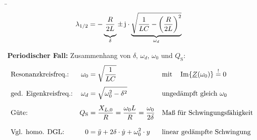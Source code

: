 \begin{frame}[t]
{}%
\b{%
\begin{minipage}{\textwidth}\centering
    \begin{minipage}[t][3cm][]{0.48\textwidth}\centering
    \end{minipage}%
    \begin{minipage}[t][3cm][]{0.48\textwidth}\centering
    \begin{align*}
        \lambda_{1/2} &= -\underbrace{
            \vphantom{\sqrt{\left(\frac{R}{2L}\right)^2}}
            \frac{R}{2L}
        }_{\delta} \pm \, \mathrm{j} \cdot \underbrace{
            \sqrt{\frac{1}{LC} - \left(\frac{R}{2L}\right)^2}
        }_{\omega_d}
    \end{align*}
    \end{minipage}
\end{minipage}\vspace{2pt}

\textbf{Periodischer Fall:} Zusammenhang von $\delta$, $\omega_d$, $\omega_0$ und $Q_{\mathrm{S}}$:
\begin{align*}
&\text{Resonanzkreisfreq.:}&
    \omega_0 &= \sqrt{\frac{1}{LC}}&
    &\text{mit}\quad \Im\{\underline{Z}(\omega_0)\} \overset{!}{=} 0 \vphantom{\bigg|}\\
&\text{ged. Eigenkreisfreq.:}&
    \omega_d &= \sqrt{\omega_0^2 - \delta^2}&
    &\text{ungedämpft gleich $\omega_0$}\vphantom{\bigg|}\\
&\text{Güte:}&
    Q_{\mathrm{S}} &= \frac{X_{L,0}}{R} = \frac{\omega_0 L}{R} = \frac{\omega_0}{2\delta}&
    &\text{Maß für Schwingungsfähigkeit} \vphantom{\bigg|}\\
&\text{Vgl. homo. DGL:}&
    0 &= \ddot y + 2\delta \cdot \dot y + \omega_0^2 \cdot y&
    &\text{linear gedämpfte Schwingung} \vphantom{\bigg|}
\end{align*}

}%
\end{frame}
